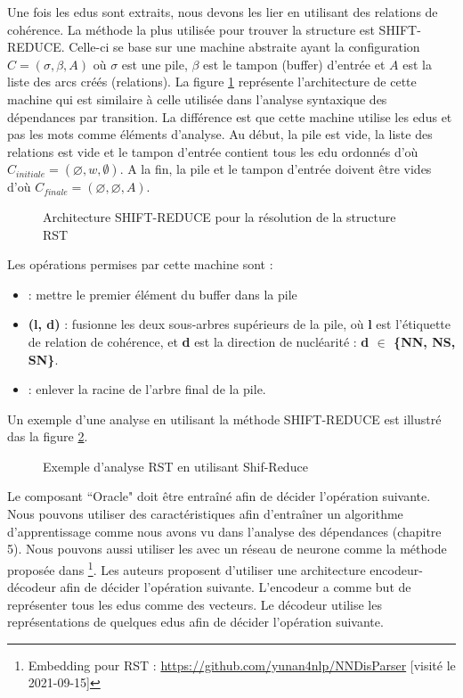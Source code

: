 \documentclass{KodeBook}
\begin{document}
Une fois les \acp{edu} sont extraits, nous devons les lier en utilisant des relations de cohérence. 
La méthode la plus utilisée pour trouver la structure  est SHIFT-REDUCE.  
Celle-ci se base sur une machine abstraite ayant la configuration $C = (\sigma, \beta, A)$ où $\sigma$ est une pile, $\beta$ est le tampon (buffer) d'entrée et $A$ est la liste des arcs créés (relations). 
La figure \ref{fig:rst-shift-reduce} représente l'architecture de cette machine qui est similaire à celle utilisée dans l'analyse syntaxique des dépendances par transition. 
La différence est que cette machine utilise les \acp{edu} et pas les mots comme éléments d'analyse.
Au début, la pile est vide, la liste des relations est vide et le tampon d'entrée contient tous les \ac{edu} ordonnés d'où  $C_{initiale} = (\varnothing, w, \emptyset)$. 
A la fin, la pile et le tampon d'entrée doivent être vides d'où $C_{finale} = (\varnothing, \varnothing, A)$.

\begin{figure}[!ht]
	\centering
	\caption{Architecture SHIFT-REDUCE pour la résolution de la structure RST}
	\label{fig:rst-shift-reduce}
\end{figure}

Les opérations permises par cette machine sont :
\begin{itemize}
	\item {} : mettre le premier élément du buffer dans la pile
	\item {}\textbf{(l, d)} : fusionne les deux sous-arbres supérieurs de la pile, où \textbf{l} est l'étiquette de relation de cohérence, et \textbf{d} est la direction de nucléarité : \textbf{d $ \in $ \{NN, NS, SN\}}.
	\item {} : enlever la racine de l'arbre final de la pile.
\end{itemize}
Un exemple d'une analyse  en utilisant la méthode SHIFT-REDUCE est illustré das la figure \ref{fig:rst-shred-yu-al}.

\begin{figure}[!ht]
	\centering
	
	\caption[Exemple d'analyse RST en utilisant Shif-Reduce]{Exemple d'analyse RST en utilisant Shif-Reduce \cite{2018-yu-al}}
	\label{fig:rst-shred-yu-al}
\end{figure}

Le composant ``Oracle" doit être entraîné afin de décider l'opération suivante. 
Nous pouvons utiliser des caractéristiques afin d'entraîner un algorithme d'apprentissage comme nous avons vu dans l'analyse des dépendances (chapitre 5). 
Nous pouvons aussi utiliser les  avec un réseau de neurone comme la méthode proposée dans \cite{2018-yu-al}\footnote{Embedding pour RST : \url{https://github.com/yunan4nlp/NNDisParser} [visité le 2021-09-15]}. 
Les auteurs proposent d'utiliser une architecture encodeur-décodeur afin de décider l'opération suivante. 
L'encodeur a comme but de représenter tous les \acp{edu} comme des vecteurs.
Le décodeur utilise les représentations de quelques \acp{edu} afin de décider l'opération suivante. 
\end{document}
